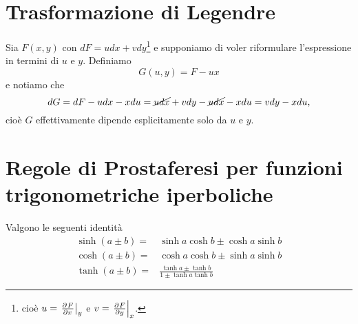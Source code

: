 \section{Trasformazione di Legendre}
Sia $F(x,y)$ con $dF=udx+vdy$\footnote{cio\`e $u=\ppb xFy$ e $v=\ppb yFx$.} e supponiamo di voler riformulare l'espressione in termini di $u$ e $y$. Definiamo 
\[G(u,y)=F-ux\]
e notiamo che
\[dG=dF-udx-xdu=\cancel{udx}+vdy-\cancel{udx}-xdu=vdy-xdu,\]
cio\`e $G$ effettivamente dipende esplicitamente solo da $u$ e $y$.


\section{Regole di Prostaferesi per funzioni trigonometriche iperboliche}\label{SommaTangenteIperbolica}
Valgono le seguenti identit\`a
\begin{align*}
\sinh(a\pm b)=&\sinh a\cosh b \pm \cosh a\sinh b\\
\cosh(a\pm b)=&\cosh a\cosh b\pm \sinh a\sinh b\\
\tanh(a\pm b)=&\frac{\tanh a\pm \tanh b}{1\pm \tanh a \tanh b}
\end{align*}





